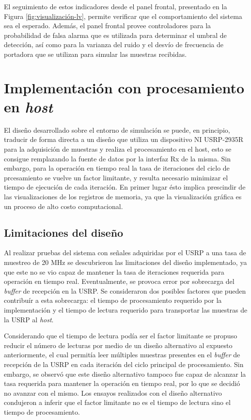 El seguimiento de estos indicadores desde el panel frontal, presentado en la Figura \ref{fig:visualización-lv}, permite verificar que el comportamiento del sistema sea el esperado. Además, el panel frontal provee controladores para la probabilidad de falsa alarma que es utilizada para determinar el umbral de detección, así como para la varianza del ruido y el desvío de frecuencia de portadora que se utilizan para simular las muestras recibidas.


\section{Implementación con procesamiento en \textit{host}}

El diseño desarrollado sobre el entorno de simulación se puede, en principio, traducir de forma directa a un diseño que utiliza un dispositivo NI USRP-2935R para la adquisición de muestras y realiza el procesamiento en el host, esto se consigue remplazando la fuente de datos por la interfaz Rx de la misma. Sin embargo, para la operación en tiempo real la tasa de iteraciones del ciclo de prcesamiento se vuelve un factor limitante, y resulta necesario minimizar el tiempo de ejecución de cada iteración. En primer lugar ésto implica prescindir de las visualizaciones de los registros de memoria, ya que la visualización gráfica es un proceso de alto costo computacional.

\subsection{Limitaciones del diseño}

Al realizar pruebas del sistema con señales adquiridas por el USRP a una tasa de muestreo de 20 MHz se descubrieron las limitaciones del diseño implementado, ya que este no se vio capaz de mantener la tasa de iteraciones requerida para operación en tiempo real. Eventualmente, se provoca error por sobrecarga del \textit{buffer} de recepción en la USRP. Se consideraron dos posibles factores que pueden contribuír a esta sobrecarga: el tiempo de procesamiento requerido por la implementación y el tiempo de lectura requerido para transportar las muestras de la USRP al \textit{host}. 

Considerando que el tiempo de lectura podía ser el factor limitante se propuso reducir el número de lecturas por medio de un diseño alternativo al expuesto anteriormente, el cual permitía leer múltiples muestras presentes en el \textit{buffer} de recepción de la USRP en cada iteración del ciclo principal de procesamiento. Sin embargo, se observó que este diseño alternativo tampoco fue capaz de alcanzar la tasa requerida para mantener la operación en tiempo real, por lo que se decidió no avanzar con el mismo. Los ensayos realizados con el diseño alternativo condujeron a inferir que el factor limitante no es el tiempo de lectura sino el tiempo de procesamiento. 

